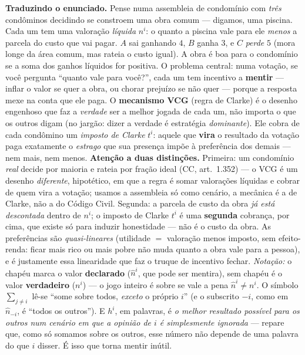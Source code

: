\documentclass[11pt]{article}
\begin{document}
\noindent\textbf{Traduzindo o enunciado.} Pense numa assembleia de condomínio com \emph{três} condôminos
decidindo se constroem uma obra comum --- digamos, uma piscina. Cada um tem uma valoração \emph{líquida} $n^i$:
o quanto a piscina vale para ele \emph{menos} a parcela do custo que vai pagar. $A$ sai ganhando $4$, $B$ ganha
$3$, e $C$ \emph{perde} $5$ (mora longe da área comum, mas rateia o custo igual). A obra é boa para o condomínio
se a soma dos ganhos líquidos for positiva. O problema central: numa votação, se você pergunta ``quanto vale
para você?'', cada um tem incentivo a \textbf{mentir} --- inflar o valor se quer a obra, ou chorar prejuízo se
não quer --- porque a resposta mexe na conta que ele paga. O \textbf{mecanismo VCG} (regra de Clarke) é o
desenho engenhoso que faz a \emph{verdade} ser a melhor jogada de cada um, não importa o que os outros digam
(no jargão: dizer a verdade é estratégia \emph{dominante}).
Ele cobra de cada condômino um \emph{imposto de Clarke} $t^i$: aquele que \textbf{vira} o resultado da votação
paga exatamente o \emph{estrago} que sua presença impõe à preferência dos demais --- nem mais, nem menos.
\textbf{Atenção a duas distinções.} Primeira: um condomínio \emph{real} decide por maioria e rateia por fração
ideal (CC, art.~1.352) --- o VCG é um desenho \emph{diferente}, hipotético, em que a regra é somar valorações
líquidas e cobrar de quem vira a votação; usamos a assembleia só como cenário, a mecânica é a de Clarke, não a
do Código Civil. Segunda: a parcela de custo da obra \emph{já está descontada} dentro de $n^i$; o imposto de
Clarke $t^i$ é uma \textbf{segunda} cobrança, por cima, que existe só para induzir honestidade --- não é o
custo da obra. As preferências são \emph{quasi-lineares} (utilidade $=$ valoração menos imposto, sem
efeito-renda: ficar mais rico ou mais pobre não muda quanto a obra vale para a pessoa), e é justamente essa
linearidade que faz o truque de incentivo fechar.
\emph{Notação:} o chapéu marca o valor \textbf{declarado} ($\hat n^i$, que pode ser mentira), sem chapéu é o
valor \textbf{verdadeiro} ($n^i$) --- o jogo inteiro é sobre se vale a pena $\hat n^i\ne n^i$. O símbolo
$\sum_{j\ne i}$ lê-se ``some sobre todos, \emph{exceto} o próprio $i$'' (e o subscrito $-i$, como em
$\hat n_{-i}$, é ``todos os outros''). E $h^i$, em palavras, é \emph{o melhor resultado possível para os outros
num cenário em que a opinião de $i$ é simplesmente ignorada} --- repare que, como só somamos sobre os outros,
esse número não depende de uma palavra do que $i$ disser. É isso que torna mentir inútil.
\end{document}
